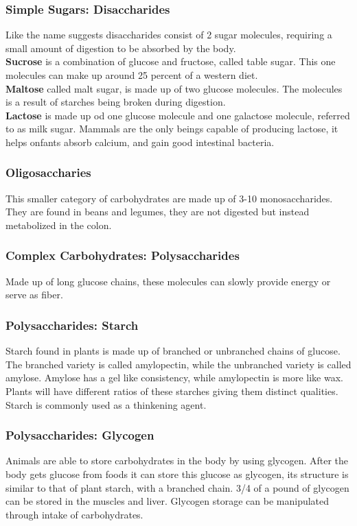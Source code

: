 \documentclass[letterpaper, 11pt]{article}
\begin{document}
\subsubsection{Simple Sugars: Disaccharides}
\label{sec:orgc7755f4}
Like the name suggests disaccharides consist of 2 sugar molecules, requiring a small amount of digestion to be absorbed by the body.\\
\textbf{Sucrose} is a combination of glucose and fructose, called table sugar. This one molecules can make up around 25 percent of a western diet.\\
\textbf{Maltose} called malt sugar, is made up of two glucose molecules. The molecules is a result of starches being broken during digestion.\\
\textbf{Lactose} is made up od one glucose molecule and one galactose molecule, referred to as milk sugar. Mammals are the only beings capable of producing lactose, it helps onfants absorb calcium, and gain good intestinal bacteria.\\
\subsubsection{Oligosaccharies}
\label{sec:orgd938b56}
This smaller category of carbohydrates are made up of 3-10 monosaccharides. They are found in beans and legumes, they are not digested but instead metabolized in the colon.\\
\subsubsection{Complex Carbohydrates: Polysaccharides}
\label{sec:orga1489f3}
Made up of long glucose chains, these molecules can slowly provide energy or serve as fiber.\\
\subsubsection{Polysaccharides: Starch}
\label{sec:orgbcd7834}
Starch found in plants is made up of branched or unbranched chains of glucose. The branched variety is called amylopectin, while the unbranched variety is called amylose. Amylose has a gel like consistency, while amylopectin is more like wax. Plants will have different ratios of these starches giving them distinct qualities. Starch is commonly used as a thinkening agent.\\
\subsubsection{Polysaccharides: Glycogen}
\label{sec:orgf27042a}
Animals are able to store carbohydrates in the body by using glycogen. After the body gets glucose from foods it can store this glucose as glycogen, its structure is similar to that of plant starch, with a branched chain. 3/4 of a pound of glycogen can be stored in the muscles and liver. Glycogen storage can be manipulated through intake of carbohydrates.\\
\end{document}

